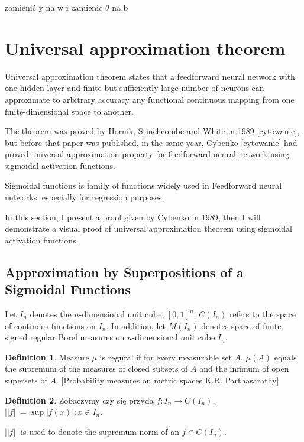 \documentclass[]{article}
\theoremstyle{definition}
\newtheorem{definition}{Definition}[section]
\begin{document}
zamienić y na w i zamienic $\theta$ na b


\newpage
\section{Universal approximation theorem}

Universal approximation theorem states that a feedforward neural network with one hidden layer and finite but sufficiently large number of neurons can approximate to arbitrary accuracy any functional continuous mapping from one finite-dimensional space to another. 


The theorem was proved by Hornik, Stinchcombe and White in 1989 [cytowanie], but before that paper was published, in the same year, Cybenko [cytowanie] had proved universal approximation property for feedforward neural network using sigmoidal activation functions.

Sigmoidal functions is family of functions widely used in Feedforward neural networks, especially for regression purposes.

In this section, I present a proof given by Cybenko in 1989, then I will demonstrate a visual proof of universal approximation theorem using sigmoidal activation functions.



\subsection{Approximation by Superpositions of a Sigmoidal Functions}

Let $I_n$ denotes the $n$-dimensional unit cube, $[0,1]^n$. $C(I_n)$ refers to the space of continous functions on $I_n$. In addition, let $M(I_n)$ denotes space of finite, signed regular Borel measures on $n$-dimensional unit cube $I_n$. 


\begin{definition}
Measure $\mu$ is regural if for every measurable set $A$, $\mu(A)$ equals the supremum of the measures of closed subsets of $A$ and the infimum of open supersets of $A$. [Probability measures on metric spaces K.R. Parthasarathy]	
\end{definition}
 
 
\begin{definition} Zobaczymy czy się przyda
	$f:I_n \rightarrow C(I_n),$
	$||f|| = \sup {|f(x)| : x \in I_n }$.
\end{definition}
 
 
  $||f||$ is used to denote the supremum norm of an $f \in C(I_n)$. 
\end{document}
